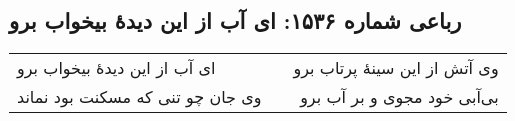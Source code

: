 \begin{center}
\section*{رباعی شماره ۱۵۳۶: ای آب از این دیدهٔ بیخواب برو}
\label{sec:1536}
\begin{longtable}{l p{0.5cm} r}
ای آب از این دیدهٔ بیخواب برو
&&
وی آتش از این سینهٔ پرتاب برو
\\
وی جان چو تنی که مسکنت بود نماند
&&
بی‌آبی خود مجوی و بر آب برو
\\
\end{longtable}
\end{center}

